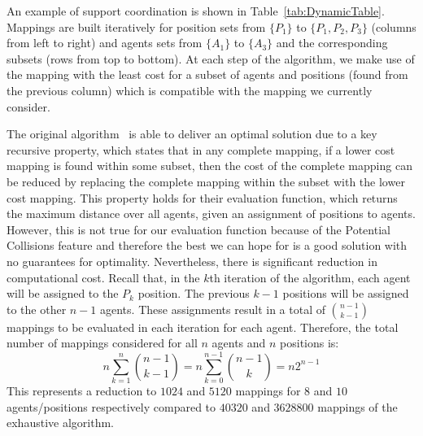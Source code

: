  

An example of support coordination is shown in Table~\ref{tab:DynamicTable}. Mappings are built iteratively for position sets from $\lbrace P_{1} \rbrace$ to $\lbrace P_{1},P_{2},P_{3} \rbrace$ (columns from left to right) and agents sets from $\{A_1\}$ to $\{A_3\}$ and the corresponding subsets (rows from top to bottom). At each step of the algorithm, we make use of the mapping with the least cost for a subset of agents and positions (found from the previous column) which is compatible with the mapping we currently consider.


The original algorithm~\cite{UtAustinVillaPaper} is able to deliver an optimal solution due to a key recursive property, which states that in any complete mapping, if a lower cost mapping is found within some subset, then the cost of the complete mapping can be reduced by replacing the complete mapping within the subset with the lower cost mapping. This property holds for their evaluation function, which returns the maximum distance over all agents, given an assignment of positions to agents. However, this is not true for our evaluation function because of the Potential Collisions feature and therefore the best we can hope for is a good solution with no guarantees for optimality. Nevertheless, there is significant reduction in computational cost. Recall that, in the $k$th iteration of the algorithm, each agent will be assigned to the $P_{k}$ position. The previous $k-1$ positions will be assigned to the other $n-1$ agents. These assignments result in a total of $ {{n-1}\choose{k-1}} $ mappings to be evaluated in each iteration for each agent. Therefore, the total number of mappings considered for all $n$ agents and $n$ positions is:  
\[
n \sum_{k=1}^n {{n-1}\choose{k-1}} = n \sum_{k=0}^{n-1}{{n-1}\choose{k}} = n 2^{n-1}
\]
This represents a reduction to $1024$ and $5120$ mappings for $8$ and $10$ agents/positions respectively compared to $40320$ and $3628800$ mappings of the exhaustive algorithm. 



